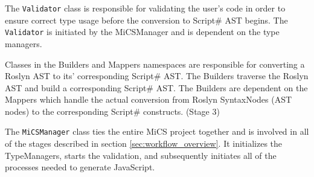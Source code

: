 The \texttt{Validator} class is responsible for validating the user's code in order to ensure correct type usage before the conversion to Script\# AST begins. The \texttt{Validator} is initiated by the MiCSManager and is dependent on the type managers.

Classes in the Builders and Mappers namespaces are responsible for converting a Roslyn AST to its' corresponding Script\# AST. The Builders traverse the Roslyn AST and build a corresponding Script\# AST. The Builders are dependent on the Mappers which handle the actual conversion from Roslyn SyntaxNodes (AST nodes) to the corresponding Script\# constructs. (Stage 3)

The \texttt{MiCSManager} class ties the entire MiCS project together and is involved in all of the stages described in section \ref{sec:workflow_overview}. It initializes the TypeManagers, starts the validation, and subsequently initiates all of the processes needed to generate JavaScript. 

